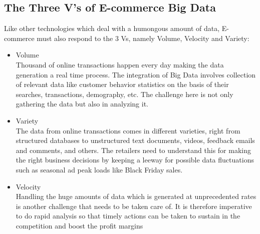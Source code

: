 \subsection{The Three V's of E-commerce Big Data}
Like other technologies which deal with a humongous amount of data, E-commerce must also respond to the 3 Vs, namely Volume, Velocity and Variety:
\begin{itemize}
    \item Volume \\
    Thousand of online transactions happen every day making the data generation a real time process. The integration of Big Data involves collection of relevant data like customer behavior statistics on the basis of their searches, transactions, demography, etc. The challenge here is not only gathering the data but also in analyzing it.
    \item Variety \\
    The data from online transactions comes in different varieties, right from structured databases to unstructured text documents, videos, feedback emails and comments, and others. The retailers need to understand this for making the right business decisions by keeping a leeway for possible data fluctuations such as seasonal ad peak loads like Black Friday sales.
    \item Velocity \\
    Handling the huge amounts of data which is generated at unprecedented rates is another challenge that needs to be taken care of. It is therefore imperative to do rapid analysis so that timely actions can be taken to sustain in the competition and boost the profit margins \cite{link4}
\end{itemize}


